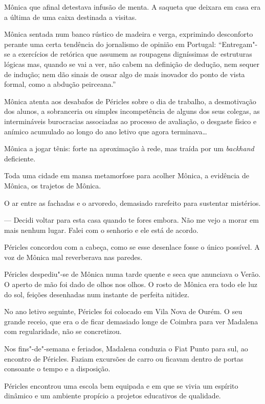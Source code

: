 Mônica que afinal detestava infusão de menta. A saqueta que deixara em
casa era a última de uma caixa destinada a visitas.

Mônica sentada num banco rústico de madeira e verga, exprimindo
desconforto perante uma certa tendência do jornalismo de opinião em
Portugal: ``Entregam"-se a exercícios de retórica que assumem as roupagens
digníssimas de estruturas lógicas mas, quando se vai a ver, não cabem na
definição de dedução, nem sequer de indução; nem dão sinais de ousar
algo de mais inovador do ponto de vista formal, como a abdução
peirceana.''

Mônica atenta aos desabafos de Péricles sobre o dia de trabalho, a
desmotivação dos alunos, a sobranceria ou simples incompetência de
alguns dos seus colegas, as intermináveis burocracias associadas ao
processo de avaliação, o desgaste físico e anímico acumulado ao longo do
ano letivo que agora terminava\ldots{}

Mônica a jogar tênis: forte na aproximação à rede, mas
traída por um \emph{backhand }deficiente.

Toda uma cidade em mansa metamorfose para acolher Mônica, a evidência de
Mônica, os trajetos de Mônica.

O ar entre as fachadas e o arvoredo, demasiado rarefeito para sustentar
mistérios.

--- Decidi voltar para esta casa quando te fores embora. Não me vejo a
morar em mais nenhum lugar. Falei com o senhorio e ele está de acordo.

Péricles concordou com a cabeça, como se esse desenlace fosse o único
possível. A voz de Mônica mal reverberava nas paredes.

Péricles despediu"-se de Mônica numa tarde quente e seca que anunciava o
Verão. O aperto de mão foi dado de olhos nos olhos. O rosto de Mônica
era todo ele luz do sol, feições desenhadas num instante de perfeita
nitidez.

No ano letivo seguinte, Péricles foi colocado em Vila Nova de Ourém. O
seu grande receio, que era o de ficar demasiado longe de Coimbra para
ver Madalena com regularidade, não se concretizou.

Nos fins"-de"-semana e feriados, Madalena conduzia o Fiat Punto para sul,
ao encontro de Péricles. Faziam excursões de carro ou ficavam dentro de
portas consoante o tempo e a disposição.

Péricles encontrou uma escola bem equipada e em que se vivia um espírito
dinâmico e um ambiente propício a projetos educativos de qualidade.

